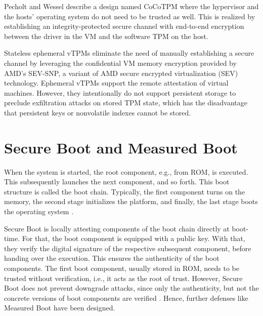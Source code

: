 Pecholt and Wessel \cite{Pecholt2022} describe a design named CoCoTPM where the hypervisor and the hosts' operating system do not need to be trusted as well. This is realized by establishing an integrity-protected secure channel with end-to-end encryption between the driver in the VM and the software TPM on the host.

Stateless ephemeral vTPMs \cite{Narayanan2023} eliminate the need of manually establishing a secure channel by leveraging the confidential VM memory encryption provided by AMD's SEV-SNP, a variant of AMD secure encrypted virtualization (SEV) technology.
Ephemeral vTPMs support the remote attestation of virtual machines.
However, they intentionally do not support persistent storage to preclude exfiltration attacks on stored TPM state, which has the disadvantage that persistent keys or nonvolatile indexes cannot be stored.


\section{Secure Boot and Measured Boot}

When the system is started, the root component, e.g., from ROM, is executed. This subsequently launches the next component, and so forth. This boot structure is called the boot chain. Typically, the first component turns on the memory, the second stage initializes the platform, and finally, the last stage boots the operating system \cite{Yao2020}.

Secure Boot \cite{Hendricks2004, UEFI, Frazelle2020} is locally attesting components of the boot chain directly at boot-time. For that, the boot component is equipped with a public key. With that, they verify the digital signature of the respective subsequent component, before handing over the execution. This ensures the authenticity of the boot components. The first boot component, usually stored in ROM, needs to be trusted without verification, i.e., it acts as the root of trust. However, Secure Boot does not prevent downgrade attacks, since only the authenticity, but not the concrete versions of boot components are verified \cite{272306}. Hence, further defenses like Measured Boot have been designed.


